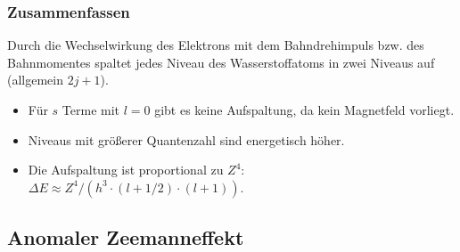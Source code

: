 \documentclass{subfiles}
\begin{document}
    \subsubsection*{Zusammenfassen}
        Durch die Wechselwirkung des Elektrons mit dem Bahndrehimpuls bzw. des Bahnmomentes spaltet jedes Niveau des Wasserstoffatoms in zwei Niveaus auf (allgemein $2j + 1$). 
        \begin{itemize}[label=$\to$]
            \item Für $s$ Terme mit $l = 0$ gibt es keine Aufspaltung, da kein Magnetfeld vorliegt. 
            \item Niveaus mit größerer Quantenzahl sind energetisch höher.
            \item Die Aufspaltung ist proportional zu $Z^4$: $\Delta E \approx Z^4/(h^3\cdot (l+1/2)\cdot (l + 1))$. 
        \end{itemize}

    \subsection{Anomaler Zeemanneffekt}
\end{document}
